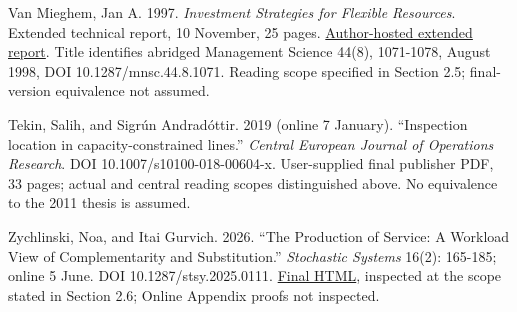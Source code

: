 \documentclass[
  11pt,
  a4paper,
]{article}
\begin{document}
Van Mieghem, Jan A. 1997. \emph{Investment Strategies for Flexible
Resources}. Extended technical report, 10 November, 25 pages.
\href{https://www.kellogg.northwestern.edu/faculty/vanmieghem/htm/flextec0.pdf}{Author-hosted
extended report}. Title identifies abridged Management Science 44(8),
1071-1078, August 1998, DOI 10.1287/mnsc.44.8.1071. Reading scope
specified in Section 2.5; final-version equivalence not assumed.

Tekin, Salih, and Sigrún Andradóttir. 2019 (online 7 January).
``Inspection location in capacity-constrained lines.'' \emph{Central
European Journal of Operations Research}. DOI
10.1007/s10100-018-00604-x. User-supplied final publisher PDF, 33 pages;
actual and central reading scopes distinguished above. No equivalence to
the 2011 thesis is assumed.

Zychlinski, Noa, and Itai Gurvich. 2026. ``The Production of Service: A
Workload View of Complementarity and Substitution.'' \emph{Stochastic
Systems} 16(2): 165-185; online 5 June. DOI 10.1287/stsy.2025.0111.
\href{https://pubsonline.informs.org/doi/full/10.1287/stsy.2025.0111}{Final
HTML}, inspected at the scope stated in Section 2.6; Online Appendix
proofs not inspected.
\end{document}
